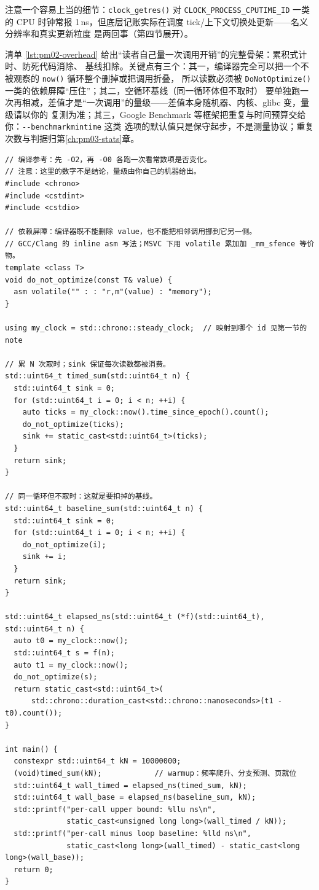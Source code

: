 \documentclass[12pt,a4paper,fontset=fandol]{ctexbook}
\newcommand{\Fn}[1]{\texttt{#1()}}
\newcommand{\Tp}[1]{\texttt{#1}}
\newcommand{\Opt}[1]{\texttt{-\/-#1}}
\newcommand{\Bk}{\discretionary{}{}{}}
\begin{document}
注意一个容易上当的细节：\Fn{clock{\Bk}\_getres} 对 \Tp{CLOCK{\Bk}\_PROCESS{\Bk}\_CPUTIME{\Bk}\_ID}
一类的 CPU 时钟常报 1\,ns，但底层记账实际在调度 tick/上下文切换处更新——名义分辨率和真实更新粒度
是两回事（第四节展开）。

清单 \ref{lst:pm02-overhead} 给出``读者自己量一次调用开销''的完整骨架：累积式计时、防死代码消除、
基线扣除。关键点有三个：其一，编译器完全可以把一个不被观察的 \Tp{now()} 循环整个删掉或把调用折叠，
所以读数必须被 \Fn{Do{\Bk}Not{\Bk}Optimize} 一类的依赖屏障``压住''；其二，空循环基线（同一循环体但不取时）
要单独跑一次再相减，差值才是``一次调用''的量级——差值本身随机器、内核、glibc 变，量级请以你的
复测为准；其三，Google Benchmark 等框架把重复与时间预算交给你：\Opt{benchmark{\Bk}min{\Bk}time} 这类
选项的默认值只是保守起步，不是测量协议；重复次数与判据归第\ref{ch:pm03-stats}章。

\begin{lstlisting}[style=cppstyle, title={自测一次取时调用的开销：反死代码消除与基线扣除}, label={lst:pm02-overhead}]
// 编译参考：先 -O2，再 -O0 各跑一次看常数项是否变化。
// 注意：这里的数字不是结论，量级由你自己的机器给出。
#include <chrono>
#include <cstdint>
#include <cstdio>

// 依赖屏障：编译器既不能删除 value，也不能把相邻调用挪到它另一侧。
// GCC/Clang 的 inline asm 写法；MSVC 下用 volatile 累加加 _mm_sfence 等价物。
template <class T>
void do_not_optimize(const T& value) {
  asm volatile("" : : "r,m"(value) : "memory");
}

using my_clock = std::chrono::steady_clock;  // 映射到哪个 id 见第一节的 note

// 累 N 次取时；sink 保证每次读数都被消费。
std::uint64_t timed_sum(std::uint64_t n) {
  std::uint64_t sink = 0;
  for (std::uint64_t i = 0; i < n; ++i) {
    auto ticks = my_clock::now().time_since_epoch().count();
    do_not_optimize(ticks);
    sink += static_cast<std::uint64_t>(ticks);
  }
  return sink;
}

// 同一循环但不取时：这就是要扣掉的基线。
std::uint64_t baseline_sum(std::uint64_t n) {
  std::uint64_t sink = 0;
  for (std::uint64_t i = 0; i < n; ++i) {
    do_not_optimize(i);
    sink += i;
  }
  return sink;
}

std::uint64_t elapsed_ns(std::uint64_t (*f)(std::uint64_t), std::uint64_t n) {
  auto t0 = my_clock::now();
  std::uint64_t s = f(n);
  auto t1 = my_clock::now();
  do_not_optimize(s);
  return static_cast<std::uint64_t>(
      std::chrono::duration_cast<std::chrono::nanoseconds>(t1 - t0).count());
}

int main() {
  constexpr std::uint64_t kN = 10000000;
  (void)timed_sum(kN);            // warmup：频率爬升、分支预测、页就位
  std::uint64_t wall_timed = elapsed_ns(timed_sum, kN);
  std::uint64_t wall_base = elapsed_ns(baseline_sum, kN);
  std::printf("per-call upper bound: %llu ns\n",
              static_cast<unsigned long long>(wall_timed / kN));
  std::printf("per-call minus loop baseline: %lld ns\n",
              static_cast<long long>(wall_timed) - static_cast<long long>(wall_base));
  return 0;
}
\end{lstlisting}
\end{document}
